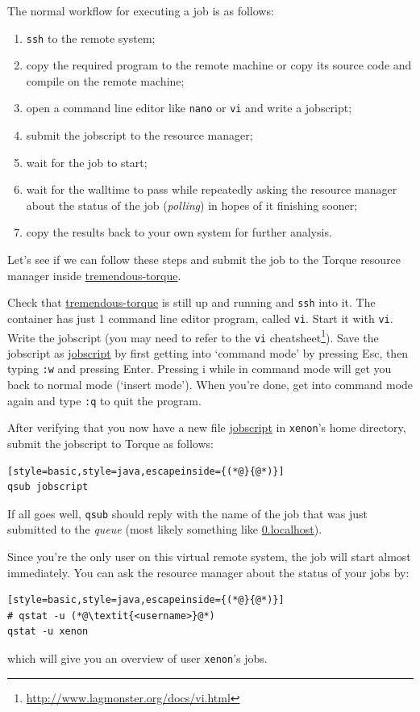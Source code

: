 \documentclass[12pt, a4paper, twoside, openany, titlepage]{book}
\begin{document}
The normal workflow for executing a job is as follows:
\begin{enumerate}
\item{\texttt{ssh} to the remote system;}
\item{copy the required program to the remote machine or copy its source code and compile on the remote machine;}
\item{open a command line editor like \texttt{nano} or \texttt{vi} and write a jobscript;}
\item{submit the jobscript to the resource manager;}
\item{wait for the job to start;}
\item{wait for the walltime to pass while repeatedly asking the resource manager about the status of the job (\textit{polling}) in hopes of it finishing sooner;}
\item{copy the results back to your own system for further analysis.}
\end{enumerate}

Let's see if we can follow these steps and submit the job to the Torque resource manager inside \url{tremendous-torque}.

Check that \url{tremendous-torque} is still up and running and \texttt{ssh} into it. The container has just 1 command line editor program, called \texttt{vi}. Start it with \texttt{vi}. Write the jobscript (you may need to refer to the \texttt{vi} cheatsheet\footnote{\url{http://www.lagmonster.org/docs/vi.html}}). Save the jobscript as \url{jobscript} by first getting into `command mode' by pressing \textsf{Esc}, then typing \texttt{:w} and pressing \textsf{Enter}. Pressing \textsf{i} while in command mode will get you back to normal mode (`insert mode'). When you're done, get into command mode again and type \texttt{:q} to quit the program.

After verifying that you now have a new file \url{jobscript} in \texttt{xenon}'s home directory, submit the jobscript to Torque as follows:
\begin{lstlisting}[style=basic,style=java,escapeinside={(*@}{@*)}]
qsub jobscript
\end{lstlisting}
If all goes well, \texttt{qsub} should reply with the name of the job that was just submitted to the \textit{queue} (most likely something like \url{0.localhost}).

Since you're the only user on this virtual remote system, the job will start almost immediately. You can ask the resource manager about the status of your jobs by:
\begin{lstlisting}[style=basic,style=java,escapeinside={(*@}{@*)}]
# qstat -u (*@\textit{<username>}@*)
qstat -u xenon
\end{lstlisting}
which will give you an overview of user \texttt{xenon}'s jobs.
\end{document}
